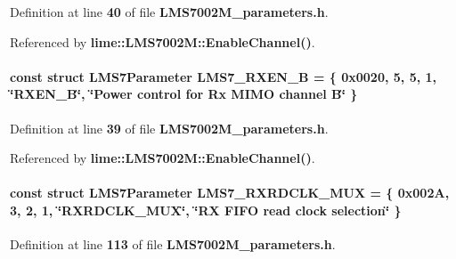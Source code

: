 Definition at line {\bf 40} of file {\bf L\+M\+S7002\+M\+\_\+parameters.\+h}.



Referenced by {\bf lime\+::\+L\+M\+S7002\+M\+::\+Enable\+Channel()}.

\paragraph[{L\+M\+S7\+\_\+\+R\+X\+E\+N\+\_\+B}]{\setlength{\rightskip}{0pt plus 5cm}const struct {\bf L\+M\+S7\+Parameter} L\+M\+S7\+\_\+\+R\+X\+E\+N\+\_\+B = \{ 0x0020, 5, 5, 1, \char`\"{}\+R\+X\+E\+N\+\_\+\+B\char`\"{}, \char`\"{}\+Power control for Rx M\+I\+M\+O channel B\char`\"{} \}\hspace{0.3cm}{\ttfamily [static]}}\label{LMS7002M__parameters_8h_a3a939d4b7e342a5fac4c55d35b45c86f}


Definition at line {\bf 39} of file {\bf L\+M\+S7002\+M\+\_\+parameters.\+h}.



Referenced by {\bf lime\+::\+L\+M\+S7002\+M\+::\+Enable\+Channel()}.

\paragraph[{L\+M\+S7\+\_\+\+R\+X\+R\+D\+C\+L\+K\+\_\+\+M\+UX}]{\setlength{\rightskip}{0pt plus 5cm}const struct {\bf L\+M\+S7\+Parameter} L\+M\+S7\+\_\+\+R\+X\+R\+D\+C\+L\+K\+\_\+\+M\+UX = \{ 0x002\+A, 3, 2, 1, \char`\"{}\+R\+X\+R\+D\+C\+L\+K\+\_\+\+M\+U\+X\char`\"{}, \char`\"{}\+R\+X F\+I\+F\+O read clock selection\char`\"{} \}\hspace{0.3cm}{\ttfamily [static]}}\label{LMS7002M__parameters_8h_a76b240094c20a913a4e2045a874fbfc5}


Definition at line {\bf 113} of file {\bf L\+M\+S7002\+M\+\_\+parameters.\+h}.

